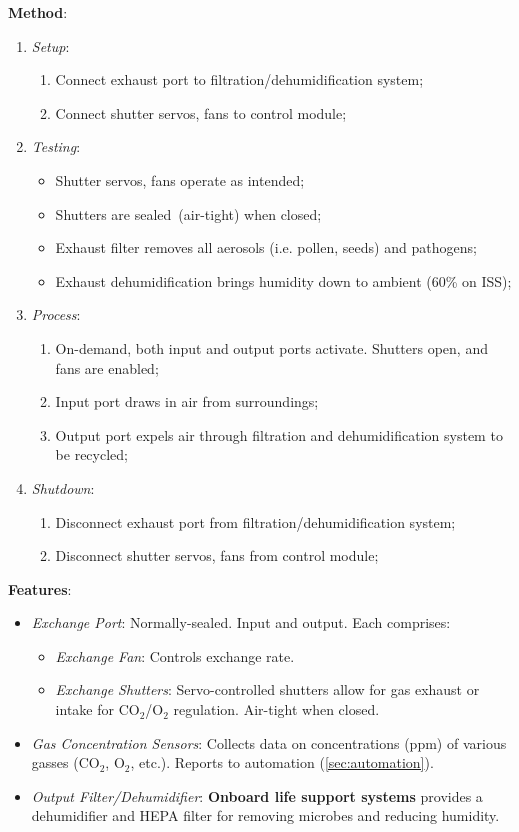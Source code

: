 \documentclass{report}
\begin{document}
\textbf{Method}:
\begin{enumerate}
    \item \textit{Setup}:
    \begin{enumerate}
        \item Connect exhaust port to filtration/dehumidification system;
        \item Connect shutter servos, fans to control module;
    \end{enumerate}
    \item \textit{Testing}:
    \begin{itemize}
        \item Shutter servos, fans operate as intended;
        \item Shutters are sealed (air-tight) when closed;
        \item Exhaust filter removes all aerosols (i.e. pollen, seeds) and pathogens;
        \item Exhaust dehumidification brings humidity down to ambient (60\% on ISS); %
    \end{itemize}
    \item \textit{Process}:
    \begin{enumerate}
        \item On-demand, both input and output ports activate. Shutters open, and fans are enabled;
        \item Input port draws in air from surroundings;
        \item Output port expels air through filtration and dehumidification system to be recycled;
    \end{enumerate}
    \item \textit{Shutdown}:
    \begin{enumerate}
        \item Disconnect exhaust port from filtration/dehumidification system;
        \item Disconnect shutter servos, fans from control module;
    \end{enumerate}
\end{enumerate}

\textbf{Features}:
\begin{itemize}
    \item \textit{Exchange Port}: Normally-sealed. Input and output. Each comprises:
    \begin{itemize}
        \item \textit{Exchange Fan}: Controls exchange rate. 
        \item \textit{Exchange Shutters}: Servo-controlled shutters allow for gas exhaust or intake for CO${}_2$/O${}_2$ regulation. Air-tight when closed.
    \end{itemize}
    \item \textit{Gas Concentration Sensors}: Collects data on concentrations (ppm) of various gasses (CO${}_2$, O${}_2$, etc.). Reports to automation (\ref{sec:automation}).
    \item \textit{Output Filter/Dehumidifier}: \textbf{Onboard life support systems} provides a dehumidifier and HEPA filter for removing microbes and reducing humidity.
\end{itemize}
\end{document}
